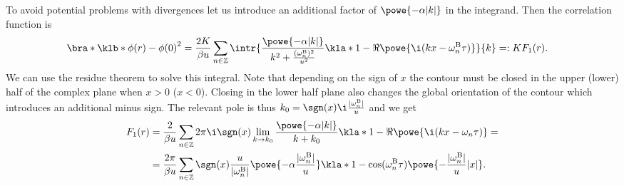 \documentclass[english, parskip=full]{scrartcl}
\newcommand{\B}{\text{B}}
\newcommand{\TODO}[1]{\color{red!60!black} #1\color{black}}
\begin{document}
To avoid potential problems with divergences let us introduce an additional factor of $\powe{-\alpha|k|}$ in the integrand.
Then the correlation function is
\begin{align}
\bra*{\klb*{\phi(r) - \phi(0)}^2} &= \frac{2K}{\beta u} \sum_{n\in\mathbb{Z}} \intr{\frac{\powe{-\alpha|k|}}{k^2 + \frac{(\omega_n^\B)^2}{u^2}}  \kla*{1 - \Re \powe{\i (kx -\omega_n^\B \tau)}} }{k} =: KF_1(r).
\end{align}
We can use the residue theorem to solve this integral.
Note that depending on the sign of $x$ the contour must be closed in the upper (lower) half of the complex plane when $x> 0$ ($x<0$).
Closing in the lower half plane also changes the global orientation of the contour which introduces an additional minus sign.
The relevant pole is thus $k_0 = \sgn (x) \i \frac{|\omega_n^\B|}{u}$ and we get
\begin{align}
F_1(r) &= \frac{2}{\beta u} \sum_{n\in\mathbb{Z}} 2\pi\i \sgn(x)  \lim_{k \rightarrow k_0} \frac{\powe{-\alpha|k|}}{k + k_0} \kla*{1 - \Re \powe{\i (kx-\omega_n\tau)}} = \\
&= \frac{2\pi}{\beta u} \sum_{n\in\mathbb{Z}} \sgn(x) \frac{u}{|\omega_n^\B|} \powe{-\alpha \frac{|\omega_n^\B|}{u}} \kla*{1 - \cos(\omega_n^\B\tau) \powe{-\frac{|\omega_n^\B|}{u}|x|} }.
\end{align}
\end{document}
